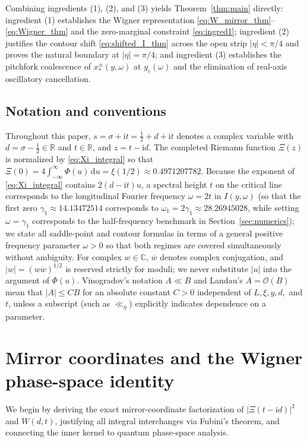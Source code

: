 \documentclass[11pt,a4paper,reqno]{amsart}
\theoremstyle{definition}
\theoremstyle{remark}
\numberwithin{equation}{section}
\newcommand{\dd}{\mathrm{d}}
\newcommand{\ii}{\mathrm{i}}
\begin{document}
Combining ingredients (1), (2), and (3) yields Theorem~\ref{thm:main} directly: ingredient (1) establishes the Wigner representation \eqref{eq:W_mirror_thm}--\eqref{eq:Wigner_thm} and the zero-marginal constraint \eqref{eq:ingred1}; ingredient (2) justifies the contour shift \eqref{eq:shifted_I_thm} across the open strip $|\eta| < \pi/4$ and proves the natural boundary at $|\eta| = \pi/4$; and ingredient (3) establishes the pitchfork coalescence of $x_*^\pm(y,\omega)$ at $y_c(\omega)$ and the elimination of real-axis oscillatory cancellation.

\subsection{Notation and conventions}\label{subsec:notation}

Throughout this paper, $s = \sigma + \ii t = \frac{1}{2} + d + \ii t$ denotes a complex variable with $d = \sigma - \frac{1}{2} \in \mathbb{R}$ and $t \in \mathbb{R}$, and $z = t - \ii d$. The completed Riemann function $\Xi(z)$ is normalized by \eqref{eq:Xi_integral} so that $\Xi(0) = 4\int_{-\infty}^\infty \Phi(u)\,\dd u = \xi(1/2) \approx 0.4971207782$. Because the exponent of \eqref{eq:Xi_integral} contains $2(d - \ii t)u$, a spectral height $t$ on the critical line corresponds to the longitudinal Fourier frequency $\omega = 2t$ in $I(y,\omega)$ (so that the first zero $\gamma_1 \approx 14.13472514$ corresponds to $\omega_1 = 2\gamma_1 \approx 28.26945028$, while setting $\omega = \gamma_1$ corresponds to the half-frequency benchmark in Section~\ref{sec:numerics}); we state all saddle-point and contour formulas in terms of a general positive frequency parameter $\omega > 0$ so that both regimes are covered simultaneously without ambiguity. For complex $w \in \mathbb{C}$, $\overline{w}$ denotes complex conjugation, and $|w| = (w\overline{w})^{1/2}$ is reserved strictly for moduli; we never substitute $|u|$ into the argument of $\Phi(u)$. Vinogradov's notation $A \ll B$ and Landau's $A = \mathcal{O}(B)$ mean that $|A| \le C B$ for an absolute constant $C > 0$ independent of $L, \xi, y, d,$ and $t$, unless a subscript (such as $\ll_\eta$) explicitly indicates dependence on a parameter.

\section{Mirror coordinates and the Wigner phase-space identity}\label{sec:wigner}

We begin by deriving the exact mirror-coordinate factorization of $|\Xi(t-\ii d)|^2$ and $W(d,t)$, justifying all integral interchanges via Fubini's theorem, and connecting the inner kernel to quantum phase-space analysis.
\end{document}

